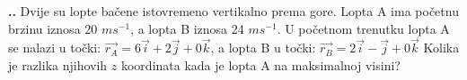 
\noindent 
\textbf{
\thecjelina.\thezadatak.}
Dvije su lopte bačene istovremeno vertikalno prema gore. Lopta A ima početnu brzinu iznosa 20 $ms^{-1} $, a lopta B iznosa 24 $ms^{-1} $. U početnom trenutku lopta A se nalazi u točki: $\vec{r_A}=6\vec{i}+2\vec{j}+0\vec{k} $, a lopta B u točki: $\vec{r_B}=2\vec{i}-\vec{j}+0\vec{k} $   Kolika je razlika njihovih $z$ koordinata kada je lopta A na maksimalnoj visini?


